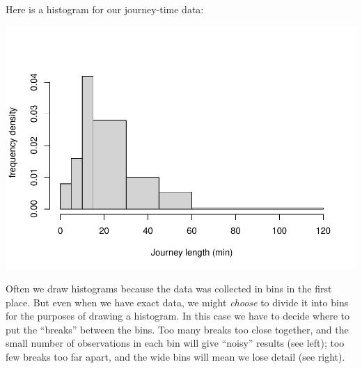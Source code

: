 \documentclass[
  a4paper,
]{book}
\newenvironment{Shaded}{\begin{snugshade}}{\end{snugshade}}
\newcommand{\AttributeTok}[1]{\textcolor[rgb]{0.77,0.63,0.00}{#1}}
\newcommand{\DecValTok}[1]{\textcolor[rgb]{0.00,0.00,0.81}{#1}}
\newcommand{\FunctionTok}[1]{\textcolor[rgb]{0.00,0.00,0.00}{#1}}
\newcommand{\NormalTok}[1]{#1}
\newcommand{\OtherTok}[1]{\textcolor[rgb]{0.56,0.35,0.01}{#1}}
\newcommand{\SpecialCharTok}[1]{\textcolor[rgb]{0.00,0.00,0.00}{#1}}
\newcommand{\StringTok}[1]{\textcolor[rgb]{0.31,0.60,0.02}{#1}}
\theoremstyle{definition}
\theoremstyle{definition}
\theoremstyle{definition}
\theoremstyle{definition}
\theoremstyle{remark}
\begin{document}
Here is a histogram for our journey-time data:

\begin{Shaded}
\end{Shaded}

\includegraphics{math1710_files/figure-latex/journeys-1.pdf}

Often we draw histograms because the data was collected in bins in the first place. But even when we have exact data, we might \emph{choose} to divide it into bins for the purposes of drawing a histogram. In this case we have to decide where to put the ``breaks'' between the bins. Too many breaks too close together, and the small number of observations in each bin will give ``noisy'' results (see left); too few breaks too far apart, and the wide bins will mean we lose detail (see right).
\end{document}
